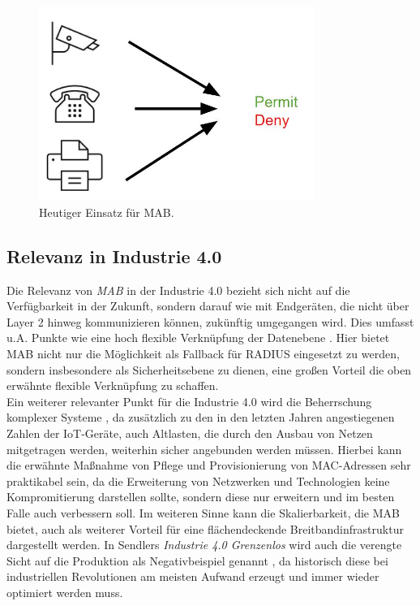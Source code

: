 \documentclass[conference]{IEEEtran}
\begin{document}
\begin{figure}[hbt]
	\centering
	\includegraphics[width=9cm]{figures/MAB_heutiger_Einsatz}
	\caption{Heutiger Einsatz für MAB.}
	\label{fig:mab-today}
\end{figure}

\vspace{.5em}
\subsection{Relevanz in Industrie 4.0}
Die Relevanz von \emph{MAB} in der Industrie 4.0 bezieht sich nicht auf die Verfügbarkeit in der Zukunft, sondern darauf wie mit Endgeräten, die nicht über Layer 2 hinweg kommunizieren können, zukünftig umgegangen wird. Dies umfasst u.A. Punkte wie eine hoch flexible Verknüpfung der Datenebene \cite{hirsch2014wandel}. Hier bietet MAB nicht nur die Möglichkeit als Fallback für RADIUS eingesetzt zu werden, sondern insbesondere als Sicherheitsebene zu dienen, eine großen Vorteil die oben erwähnte flexible Verknüpfung zu schaffen.\\ %

Ein weiterer relevanter Punkt für die Industrie 4.0 wird die Beherrschung komplexer Systeme \cite{botthof2015zukunft}, da zusätzlich zu den in den letzten Jahren angestiegenen Zahlen der IoT-Geräte, auch Altlasten, die durch den Ausbau von Netzen mitgetragen werden, weiterhin sicher angebunden werden müssen. Hierbei kann die erwähnte Maßnahme von Pflege und Provisionierung von MAC-Adressen sehr praktikabel sein, da die Erweiterung von Netzwerken und Technologien keine Kompromitierung darstellen sollte, sondern diese nur erweitern und im besten Falle auch verbessern soll. Im weiteren Sinne kann die Skalierbarkeit, die MAB bietet, auch als weiterer Vorteil für eine flächendeckende Breitbandinfrastruktur \cite{botthof2015zukunft} dargestellt werden. In Sendlers \emph{Industrie 4.0 Grenzenlos} wird auch die verengte Sicht auf die Produktion als Negativbeispiel genannt \cite{sendler2016industrie}, da historisch diese bei industriellen Revolutionen am meisten Aufwand erzeugt und immer wieder optimiert werden muss.\\
\end{document}

